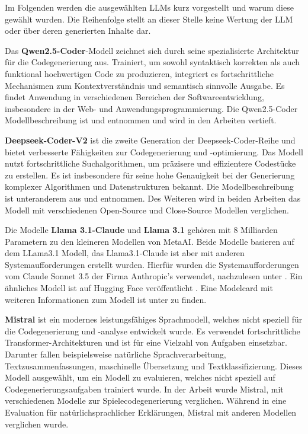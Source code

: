 Im Folgenden werden die ausgewählten LLMs kurz vorgestellt und warum diese gewählt wurden. Die Reihenfolge stellt an dieser Stelle keine Wertung der LLM oder über deren generierten Inhalte dar.\vspace{0.2cm}

Das \textbf{Qwen2.5-Coder}-Modell zeichnet sich durch seine spezialisierte Architektur für die Codegenerierung aus. Trainiert, um sowohl syntaktisch korrekten als auch funktional hochwertigen Code zu produzieren, integriert es fortschrittliche Mechanismen zum Kontextverständnis und semantisch sinnvolle Ausgabe. Es findet Anwendung in verschiedenen Bereichen der Softwareentwicklung, insbesondere in der Web- und Anwendungsprogrammierung. Die Qwen2.5-Coder Modellbeschreibung ist \cite{qwen-2024} und \cite{hui-2024} entnommen und wird in den Arbeiten vertieft.\vspace{0.2cm}

\textbf{Deepseek-Coder-V2} ist die zweite Generation der Deepseek-Coder-Reihe und bietet verbesserte Fähigkeiten zur Codegenerierung und -optimierung. Das Modell nutzt fortschrittliche Suchalgorithmen, um präzisere und effizientere Codestücke zu erstellen. Es ist insbesondere für seine hohe Genauigkeit bei der Generierung komplexer Algorithmen und Datenstrukturen bekannt. Die Modellbeschreibung ist unteranderem aus \cite{deepseek-ai-2024} und \cite{cui-2024} entnommen. Des Weiteren wird in beiden Arbeiten das Modell mit verschiedenen Open-Source und Close-Source Modellen verglichen.\vspace{0.2cm} 

Die Modelle \textbf{Llama 3.1-Claude} und \textbf{Llama 3.1} gehören mit 8 Milliarden Parametern zu den kleineren Modellen von MetaAI. Beide Modelle basieren auf dem LLama3.1 Modell, das Llama3.1-Claude ist aber mit anderen Systemaufforderungen erstellt wurden. Hierfür wurden die Systemaufforderungen vom Claude Sonnet 3.5 der Firma Anthropic’s verwendet, nachzulesen unter \cite{ollama_page_llama31_claude}. Ein ähnliches Modell ist auf Hugging Face veröffentlicht \cite{huggingface_page_llama31_claude}. Eine Modelcard mit weiteren Informationen zum Modell ist unter \cite{meta-llama-no-date} zu finden.\vspace{0.2cm}

\textbf{Mistral} ist ein modernes leistungsfähiges Sprachmodell, welches nicht speziell für die Codegenerierung und -analyse entwickelt wurde. Es verwendet fortschrittliche Transformer-Architekturen und ist für eine Vielzahl von Aufgaben einsetzbar. Darunter fallen beispielsweise natürliche Sprachverarbeitung, Textzusammenfassungen, maschinelle Übersetzung und Textklassifizierung. Dieses Modell ausgewählt, um ein Modell zu evaluieren, welches nicht speziell auf Codegenerierungsaufgaben trainiert wurde. In der Arbeit \cite{eberhardinger-2024} wurde Mistral, mit verschiedenen Modelle zur Spielecodegenerierung verglichen. Während in \cite{quan-2024} eine Evaluation für natürlichsprachlicher Erklärungen, Mistral mit anderen Modellen verglichen wurde.\vspace{0.2cm}

